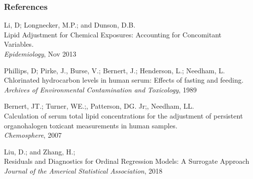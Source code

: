 \documentclass{beamer}
\begin{document}
\begin{frame}
\frametitle{References}
\footnotesize{
	\begin{thebibliography}{99} %
		
		 Li, D; Longnecker, M.P.; and Dunson, D.B. \\
		\newblock Lipid Adjustment for Chemical Exposures: Accounting for Concomitant Variables.\\
		\newblock \emph{Epidemiology}, Nov 2013
		
		Phillips, D; Pirke, J., Burse, V.; Bernert, J.; Henderson, L.; Needham, L.\\
		\newblock Chlorinated hydrocarbon levels in human serum: Effects of fasting and feeding.\\
		\newblock \emph{Archives of Environmental Contamination and Toxicology}, 1989
		
		 Bernert, JT.; Turner, WE.;, Patterson, DG. Jr;, Needham, LL.\\
		\newblock Calculation of serum total lipid concentrations for the adjustment of persistent organohalogen toxicant measurements in human samples.\\
		\newblock \emph{Chemosphere}, 2007
		
		 Liu, D.; and Zhang, H.;\\
		\newblock Residuals and Diagnostics for Ordinal Regression Models: A Surrogate Approach\\
		\newblock \emph{Journal of the Americal Statistical Association}, 2018
		
	\end{thebibliography}
}
\end{frame}
\appendix
\end{document}

